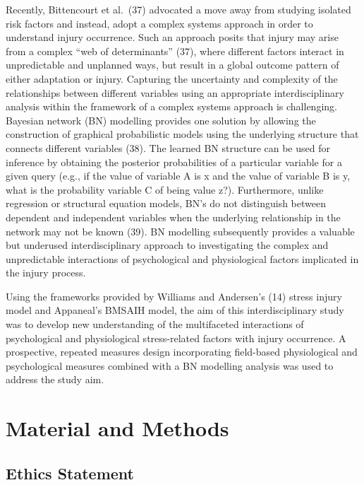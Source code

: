 \documentclass[
  english,
  man]{apa6}
\begin{document}
Recently, Bittencourt et al.~(37) advocated a move away from studying isolated risk factors and instead, adopt a complex systems approach in order to understand injury occurrence. Such an approach posits that injury may arise from a complex ``web of determinants'' (37), where different factors interact in unpredictable and unplanned ways, but result in a global outcome pattern of either adaptation or injury. Capturing the uncertainty and complexity of the relationships between different variables using an appropriate interdisciplinary analysis within the framework of a complex systems approach is challenging. Bayesian network (BN) modelling provides one solution by allowing the construction of graphical probabilistic models using the underlying structure that connects different variables (38). The learned BN structure can be used for inference by obtaining the posterior probabilities of a particular variable for a given query (e.g., if the value of variable A is x and the value of variable B is y, what is the probability variable C of being value z?). Furthermore, unlike regression or structural equation models, BN's do not distinguish between dependent and independent variables when the underlying relationship in the network may not be known (39). BN modelling subsequently provides a valuable but underused interdisciplinary approach to investigating the complex and unpredictable interactions of psychological and physiological factors implicated in the injury process.

Using the frameworks provided by Williams and Andersen's (14) stress injury model and Appaneal's BMSAIH model, the aim of this interdisciplinary study was to develop new understanding of the multifaceted interactions of psychological and physiological stress-related factors with injury occurrence. A prospective, repeated measures design incorporating field-based physiological and psychological measures combined with a BN modelling analysis was used to address the study aim.

\hypertarget{material-and-methods}{%
\section{Material and Methods}\label{material-and-methods}}

\hypertarget{ethics-statement}{%
\subsection{Ethics Statement}\label{ethics-statement}}
\end{document}
